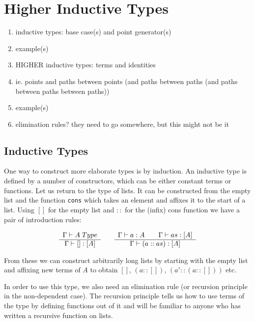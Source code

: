 \section{Higher Inductive Types}\label{sec:HITs}
\begin{enumerate}
  \item inductive types: base case(s) and point generator(s)
  \item example(s)
  \item HIGHER inductive types: terms and identities
  \item ie. points and paths between points (and paths between paths (and
    paths between paths between paths))
  \item example(s)
  \item elimination rules? they need to go somewhere, but this might not be it
\end{enumerate}

\subsection{Inductive Types}
One way to construct more elaborate types is by induction. An inductive type is
defined by a number of constructors, which can be either constant terms or
functions. Let us return to the type of lists. It can be constructed from the
empty list and the function \texttt{cons} which takes an element and affixes it
to the start of a list. Using $[]$ for the empty list and $::$ for the (infix)
cons function we have a pair of introduction rules:

\[
  \begin{array}[t]{c}
    \Gamma \vdash A \; Type\\
    \hline
    \Gamma \vdash [] : [A]\\
  \end{array}
  \qquad
  \begin{array}[t]{c}
    \Gamma \vdash a:A \qquad \Gamma \vdash as:[A] \\
    \hline
    \Gamma \vdash ( a :: as ) : [A]
  \end{array}
\]

From these we can construct arbitrarily long lists by starting with the empty
list and affixing new terms of $A$ to obtain $[]$, $(a::[])$, $(a'::(a::[]))$ etc.

In order to use this type, we also need an elimination rule (or
recursion principle in the non-dependent case). The recursion principle tells us
how to use terms of the type by defining functions out of it and will be
familiar to anyone who has written a recursive function on lists.

